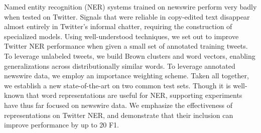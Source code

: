 Named entity recognition (NER) systems trained on newswire perform very badly when tested on Twitter. Signals that were reliable in copy-edited text disappear almost entirely in Twitter's informal chatter, requiring the construction of specialized models. Using well-understood techniques, we set out to improve Twitter NER performance when given a small set of annotated training tweets. To leverage unlabeled tweets, we build Brown clusters and word vectors, enabling generalizations across distributionally similar words. To leverage annotated newswire data, we employ an importance weighting scheme. Taken all together, we establish a new state-of-the-art on two common test sets. Though it is well-known that word representations are useful for NER, supporting experiments have thus far focused on newswire data. We emphasize the effectiveness of representations on Twitter NER, and demonstrate that their inclusion can improve performance by up to 20 F1.
